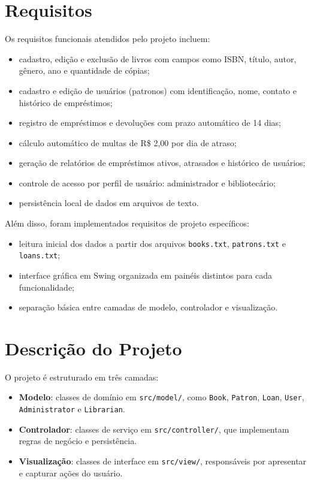 \documentclass[conference]{IEEEtran}
\begin{document}
\section{Requisitos}
Os requisitos funcionais atendidos pelo projeto incluem:
\begin{itemize}
    \item cadastro, edição e exclusão de livros com campos como ISBN, título, autor, gênero, ano e quantidade de cópias;
    \item cadastro e edição de usuários (patronos) com identificação, nome, contato e histórico de empréstimos;
    \item registro de empréstimos e devoluções com prazo automático de 14 dias;
    \item cálculo automático de multas de R\$ 2,00 por dia de atraso;
    \item geração de relatórios de empréstimos ativos, atrasados e histórico de usuários;
    \item controle de acesso por perfil de usuário: administrador e bibliotecário;
    \item persistência local de dados em arquivos de texto.
\end{itemize}

Além disso, foram implementados requisitos de projeto específicos:
\begin{itemize}
    \item leitura inicial dos dados a partir dos arquivos \texttt{books.txt}, \texttt{patrons.txt} e \texttt{loans.txt};
    \item interface gráfica em Swing organizada em painéis distintos para cada funcionalidade;
    \item separação básica entre camadas de modelo, controlador e visualização.
\end{itemize}

\section{Descrição do Projeto}
O projeto é estruturado em três camadas:
\begin{itemize}
    \item \textbf{Modelo}: classes de domínio em \texttt{src/model/}, como \texttt{Book}, \texttt{Patron}, \texttt{Loan}, \texttt{User}, \texttt{Administrator} e \texttt{Librarian}.
    \item \textbf{Controlador}: classes de serviço em \texttt{src/controller/}, que implementam regras de negócio e persistência.
    \item \textbf{Visualização}: classes de interface em \texttt{src/view/}, responsáveis por apresentar e capturar ações do usuário.
\end{itemize}
\end{document}
